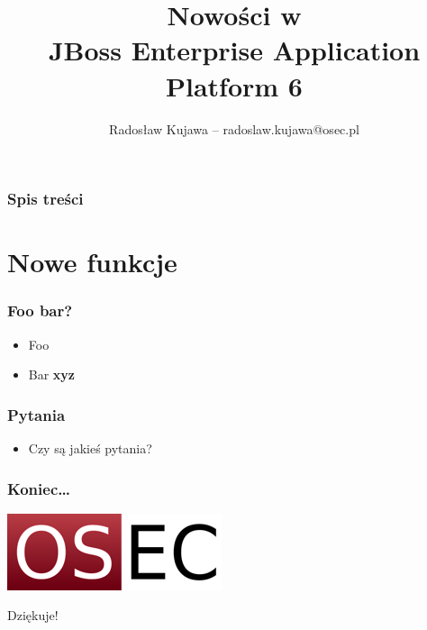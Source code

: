 \documentclass[dvipsnames,table]{beamer}
\title{Nowości w \\ JBoss Enterprise Application Platform 6}
\author{Radosław Kujawa -- radoslaw.kujawa@osec.pl}
\institute{OSEC}
\begin{document}
\begin{frame}
\titlepage
\end{frame}

\begin{frame}[allowframebreaks]
\frametitle{Spis treści}
{
\hypersetup{colorlinks=true,linkcolor=black,urlcolor=OSEC-red}
\tableofcontents
}
\end{frame}

\section{Nowe funkcje}

\begin{frame}
\frametitle{Foo bar?}
\begin{itemize}
	\item Foo
	\item Bar \textbf{xyz}
\end{itemize}
\end{frame}

\begin{frame}
\frametitle{Pytania}
\begin{itemize}
	\item Czy są jakieś pytania?
\end{itemize}
\end{frame}

\begin{frame}
\frametitle{Koniec\ldots}
\vspace*{-0.8cm}
\begin{center}
\includegraphics[scale=0.5]{img-oseclogo.png}

Dziękuje!
\end{center}
\end{frame}

 
\end{document}
